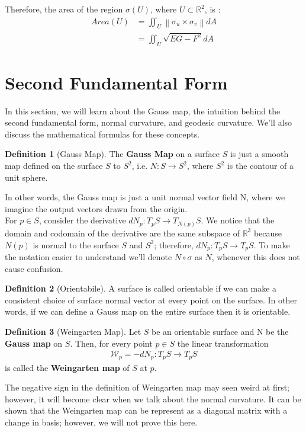 \documentclass{article}
\theoremstyle{plain}
\theoremstyle{definition}
\newtheorem{definition}{Definition}
\theoremstyle{remark}
\newcommand{\R}{\mathbb{R}}
\begin{document}
Therefore, the area of the region \( \sigma(U) \), where \( U \subset \R^2 \), is :
\begin{align*}
    Area(U) & = \iint_U \left\lVert \sigma_u \times \sigma_v \right\rVert dA \\
            & = \iint_U \sqrt{EG - F^2} dA
\end{align*}

\section{Second Fundamental Form}
In this section, we will learn about the Gauss map, the intuition behind the second fundamental form, normal curvature, and geodesic curvature. We'll also discuss the mathematical formulas for these concepts.

\begin{definition}[Gauss Map]
    The \textbf{Gauss Map} on a surface \(S\) is just a smooth map defined on the surface \(S\) to \(S^2\), i.e. \( N: S \rightarrow S^2 \), where \( S^2\) is the contour of a unit sphere.
\end{definition}
In other words, the Gauss map is just a unit normal vector field N, where we imagine the output vectors drawn from the origin.\\
For \( p \in S\), consider the derivative \(dN_p: T_pS \rightarrow T_{N(p)}S \). We notice that the domain and codomain of the derivative are the same subspace of \( \R^3\) because \(N(p)\) is normal to the surface \(S\) and \(S^2\); therefore, \(dN_p: T_pS \rightarrow T_pS  \). To make the notation easier to understand we'll denote \(N \circ \sigma\) as \(N\), whenever this does not cause confusion.

\begin{definition}[Orientabile]
    A surface is called orientable if we can make a consistent choice of surface normal vector at every point on the surface. In other words, if we can define a Gauss map on the entire surface then it is orientable.
\end{definition}
\begin{definition}[Weingarten Map]
    Let \(S\) be an orientable surface and N be the \textbf{Gauss map} on \(S\). Then, for every point \(p \in S \) the linear transformation
    \begin{align*}
        \mathcal{W}_p = -dN_p: T_pS \rightarrow T_pS
    \end{align*}
    is called the \textbf{Weingarten map} of \(S\) at \(p\).
\end{definition}
The negative sign in the definition of Weingarten map may seen weird at first; however, it will become clear when we talk about the normal curvature. It can be shown that the Weingarten map can be represent as a diagonal matrix with a change in basis; however, we will not prove this here.
\end{document}
